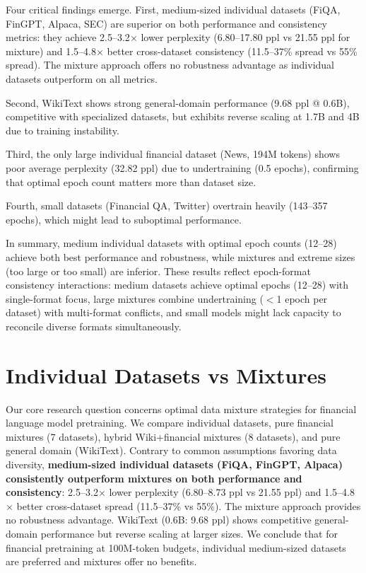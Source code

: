 Four critical findings emerge. First, {medium-sized individual datasets (FiQA, FinGPT, Alpaca, SEC) are superior on both performance and consistency metrics}: they achieve 2.5–3.2$\times$ lower perplexity (6.80–17.80 ppl vs 21.55 ppl for mixture) and 1.5–4.8$\times$ better cross-dataset consistency (11.5–37\% spread vs 55\% spread). The mixture approach offers no robustness advantage as individual datasets outperform on all metrics. 

Second, WikiText shows strong general-domain performance (9.68 ppl @ 0.6B), competitive with specialized datasets, but exhibits reverse scaling at 1.7B and 4B due to training instability. 

Third, the only large individual financial dataset (News, 194M tokens) shows poor average perplexity (32.82 ppl) due to undertraining (0.5 epochs), confirming that optimal epoch count matters more than dataset size. 

Fourth, small datasets (Financial QA, Twitter) overtrain heavily (143–357 epochs), which might lead to suboptimal performance. 

In summary, medium individual datasets with optimal epoch counts (12–28) achieve both best performance and robustness, while mixtures and extreme sizes (too large or too small) are inferior. These results reflect epoch-format consistency interactions: medium datasets achieve optimal epochs (12–28) with single-format focus, large mixtures combine undertraining ($<$1 epoch per dataset) with multi-format conflicts, and small models might lack capacity to reconcile diverse formats simultaneously.

\section{Individual Datasets vs Mixtures}

Our core research question concerns optimal data mixture strategies for financial language model pretraining. We compare individual datasets, pure financial mixtures (7 datasets), hybrid Wiki+financial mixtures (8 datasets), and pure general domain (WikiText). Contrary to common assumptions favoring data diversity, \textbf{medium-sized individual datasets (FiQA, FinGPT, Alpaca) consistently outperform mixtures on both performance and consistency}: 2.5–3.2$\times$ lower perplexity (6.80–8.73 ppl vs 21.55 ppl) and 1.5–4.8$\times$ better cross-dataset spread (11.5–37\% vs 55\%). The mixture approach provides no robustness advantage. WikiText (0.6B: 9.68 ppl) shows competitive general-domain performance but reverse scaling at larger sizes. We conclude that for financial pretraining at 100M-token budgets, individual medium-sized datasets are preferred and mixtures offer no benefits.


